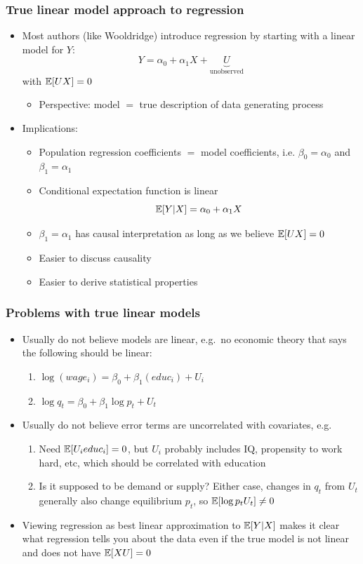 \begin{frame}[allowframebreaks]
  \frametitle{True linear model approach to regression}
  \begin{itemize}
  \item Most authors (like Wooldridge) introduce regression by
    starting with a linear model for $Y$:
    \[ Y = \alpha_0 + \alpha_1 X + \underbrace{U}_{\text{unobserved}} \] 
    with $\mathbb{E}[U X] = 0$
    \begin{itemize}
    \item Perspective: model $=$ true description of data generating
      process 
    \end{itemize}
  \item Implications:
    \begin{itemize}
    \item Population regression coefficients $=$ model coefficients,
      i.e. $\beta_0 = \alpha_0$ and $\beta_1 = \alpha_1$
    \item Conditional expectation function is linear 
      \[ \mathbb{E}[Y|X] = \alpha_0 + \alpha_1 X \]
    \item $\beta_1=\alpha_1$ has causal interpretation as long as we
      believe $\mathbb{E}[U X] = 0$
    \item Easier to discuss causality
    \item Easier to derive statistical properties
    \end{itemize}
  \end{itemize}
\end{frame}

\begin{frame}[allowframebreaks]
  \frametitle{Problems with true linear models}
  \begin{itemize}
  \item Usually do not believe models are linear, e.g.\ no economic
    theory that says the following should be linear:
    \begin{enumerate}
    \item $\log (wage_i) = \beta_0 + \beta_1 (educ_i) + U_i$
    \item $\log q_t = \beta_0 + \beta_1 \log p_t + U_t$
    \end{enumerate}
  \item Usually do not believe error terms are uncorrelated with
    covariates, e.g.\
    \begin{enumerate}
    \item Need $\mathbb{E}[U_i educ_i]=0$, but $U_i$ probably includes IQ,
      propensity to work hard, etc, which should be correlated with
      education 
    \item Is it supposed to be demand or supply? Either case, changes
      in $q_t$ from $U_t$ generally also change equilibrium $p_t$, so
      $\mathbb{E}[\log p_t U_t ] \neq 0$
    \end{enumerate}
  \item Viewing regression as best linear approximation to $\mathbb{E}[Y|X]$
    makes it clear what regression tells you about the data even if
    the true model is not linear and does not have $\mathbb{E}[XU]=0$
  \end{itemize}
\end{frame}

